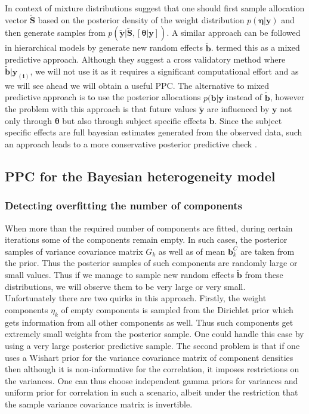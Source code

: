 In context of mixture distributions \citet{fruhwirth-schnatter_finite_2013} suggest that one should first sample allocation vector $\boldsymbol{\tilde{S}}$ based on the posterior density of the weight distribution $p(\boldsymbol{\eta}|\boldsymbol{y})$ and then generate samples from $p(\boldsymbol{\tilde{y}}|\boldsymbol{\tilde{S}}, [\boldsymbol{\theta}|\boldsymbol{y}])$. A similar approach can be followed in hierarchical models by generate new random effects $\boldsymbol{\tilde{b}}$. \citet{marshall_approximate_2003} termed this as a mixed predictive approach. Although they suggest a cross validatory method where $\boldsymbol{\tilde{b}}|\boldsymbol{y_{(i)}}$, we will not use it as it requires a significant computational effort and as we will see ahead we will obtain a useful PPC. The alternative to mixed predictive approach is to use the posterior allocations $p(\boldsymbol{b}|\boldsymbol{y}$ instead of $\boldsymbol{\tilde{b}}$, however the problem with this approach is that future values $\boldsymbol{\tilde{y}}$ are influenced by $\boldsymbol{y}$ not only through $\boldsymbol{\theta}$ but also through subject specific effects $\boldsymbol{b}$. Since the subject specific effects are full bayesian estimates generated from the observed data, such an approach leads to a more conservative posterior predictive check \citep{congdon_applied_2010}.\\

\subsection{PPC for the Bayesian heterogeneity model}
\label{subsec : ppc_bhtge}
\subsubsection{Detecting overfitting the number of components}
When more than the required number of components are fitted, during certain iterations some of the components remain empty. In such cases, the posterior samples of variance covariance matrix $G_k$ as well as of mean $\boldsymbol{b}_k^C$ are taken from the prior. Thus the posterior samples of such components are randomly large or small values. Thus if we manage to sample new random effects $\boldsymbol{\tilde{b}}$ from these distributions, we will observe them to be very large or very small.\\

Unfortunately there are two quirks in this approach. Firstly, the weight components $\eta_k$ of empty components is sampled from the Dirichlet prior which gets information from all other components as well. Thus such components get extremely small weights from the posterior sample. One could handle this case by using a very large posterior predictive sample. The second problem is that if one uses a Wishart prior for the variance covariance matrix of component densities then although it is non-informative for the correlation, it imposes restrictions on the variances. One can thus choose independent gamma priors for variances and uniform prior for correlation in such a scenario, albeit under the restriction that the sample variance covariance matrix is invertible.\\

